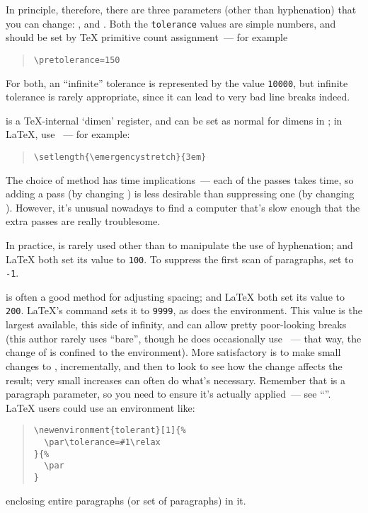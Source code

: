 In principle, therefore, there are three parameters (other than
hyphenation) that you can change: , 
and .  Both the \texttt{tolerance} values are
simple numbers, and should be set by \TeX{} primitive count
assignment~--- for example
\begin{quote}
\begin{verbatim}
\pretolerance=150
\end{verbatim}
\end{quote}
For both, an ``infinite'' tolerance is represented by the value
\texttt{10}\nothtml{\,}\texttt{000}, but infinite tolerance is rarely
appropriate, since it can lead to very bad line breaks indeed.

 is a \TeX{}-internal `dimen' register, and can
be set as normal for dimens in \plaintex{}; in \LaTeX{}, use
~--- for example:
\begin{quote}
\begin{verbatim}
\setlength{\emergencystretch}{3em}
\end{verbatim}
\end{quote}

The choice of method has time implications~--- each of the
passes takes time, so adding a pass (by changing
) is less desirable than suppressing one (by
changing ).  However, it's unusual nowadays to find a
computer that's slow enough that the extra passes are really
troublesome.

In practice,  is rarely used other than to manipulate
the use of hyphenation; \plaintex{} and \LaTeX{} both set its value
to \texttt{100}.  To suppress the first scan of paragraphs, set
 to \texttt{-1}.

 is often a good method for adjusting spacing;
\plaintex{} and \LaTeX{} both set its value to \texttt{200}.  \LaTeX{}'s
 command sets it to \texttt{9999}, as does the
 environment.  This value is the largest
available, this side of infinity, and can allow pretty poor-looking
breaks (this author rarely uses  ``bare'', though he does
occasionally use ~--- that way, the change of
 is confined to the environment).  More satisfactory is
to make small changes to , incrementally, and then to look to
see how the change affects the result; very small increases can often
do what's necessary.  Remember that  is a paragraph
parameter, so you need to ensure it's actually applied~--- see
``''.
\LaTeX{} users could use an environment like:
\begin{quote}
\begin{verbatim}
\newenvironment{tolerant}[1]{%
  \par\tolerance=#1\relax
}{%
  \par
}
\end{verbatim}
\end{quote}
enclosing entire paragraphs (or set of paragraphs) in it.

